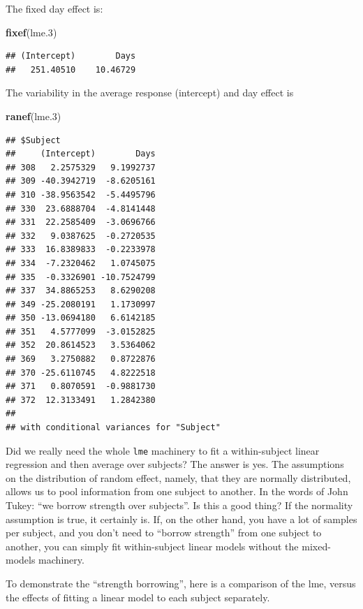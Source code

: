 \documentclass[]{book}
\newenvironment{Shaded}{\begin{snugshade}}{\end{snugshade}}
\newcommand{\FloatTok}[1]{\textcolor[rgb]{0.00,0.00,0.81}{#1}}
\newcommand{\KeywordTok}[1]{\textcolor[rgb]{0.13,0.29,0.53}{\textbf{#1}}}
\newcommand{\NormalTok}[1]{#1}
\theoremstyle{definition}
\theoremstyle{definition}
\theoremstyle{definition}
\theoremstyle{remark}
\begin{document}
The fixed day effect is:

\begin{Shaded}
\begin{Highlighting}[]
\KeywordTok{fixef}\NormalTok{(lme}\FloatTok{.3}\NormalTok{)}
\end{Highlighting}
\end{Shaded}

\begin{verbatim}
## (Intercept)        Days 
##   251.40510    10.46729
\end{verbatim}

The variability in the average response (intercept) and day effect is

\begin{Shaded}
\begin{Highlighting}[]
\KeywordTok{ranef}\NormalTok{(lme}\FloatTok{.3}\NormalTok{)}
\end{Highlighting}
\end{Shaded}

\begin{verbatim}
## $Subject
##     (Intercept)        Days
## 308   2.2575329   9.1992737
## 309 -40.3942719  -8.6205161
## 310 -38.9563542  -5.4495796
## 330  23.6888704  -4.8141448
## 331  22.2585409  -3.0696766
## 332   9.0387625  -0.2720535
## 333  16.8389833  -0.2233978
## 334  -7.2320462   1.0745075
## 335  -0.3326901 -10.7524799
## 337  34.8865253   8.6290208
## 349 -25.2080191   1.1730997
## 350 -13.0694180   6.6142185
## 351   4.5777099  -3.0152825
## 352  20.8614523   3.5364062
## 369   3.2750882   0.8722876
## 370 -25.6110745   4.8222518
## 371   0.8070591  -0.9881730
## 372  12.3133491   1.2842380
## 
## with conditional variances for "Subject"
\end{verbatim}

Did we really need the whole \texttt{lme} machinery to fit a within-subject linear regression and then average over subjects?
The answer is yes.
The assumptions on the distribution of random effect, namely, that they are normally distributed, allows us to pool information from one subject to another. In the words of John Tukey: ``we borrow strength over subjects''.
Is this a good thing? If the normality assumption is true, it certainly is.
If, on the other hand, you have a lot of samples per subject, and you don't need to ``borrow strength'' from one subject to another, you can simply fit within-subject linear models without the mixed-models machinery.

To demonstrate the ``strength borrowing'', here is a comparison of the lme, versus the effects of fitting a linear model to each subject separately.
\end{document}
